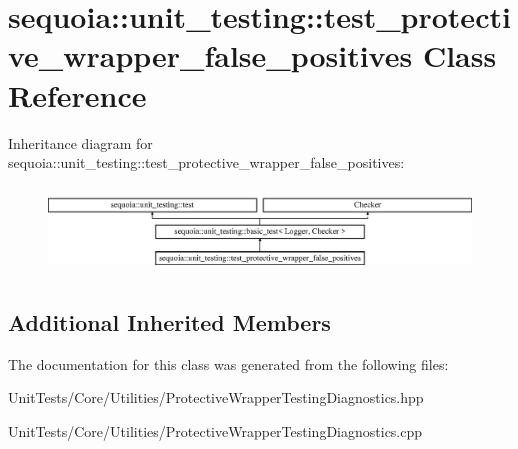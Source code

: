 \hypertarget{classsequoia_1_1unit__testing_1_1test__protective__wrapper__false__positives}{}\section{sequoia\+::unit\+\_\+testing\+::test\+\_\+protective\+\_\+wrapper\+\_\+false\+\_\+positives Class Reference}
\label{classsequoia_1_1unit__testing_1_1test__protective__wrapper__false__positives}
Inheritance diagram for sequoia\+::unit\+\_\+testing\+::test\+\_\+protective\+\_\+wrapper\+\_\+false\+\_\+positives\+:\begin{figure}[H]
\begin{center}
\leavevmode
\includegraphics[height=2.307692cm]{classsequoia_1_1unit__testing_1_1test__protective__wrapper__false__positives}
\end{center}
\end{figure}
\subsection*{Additional Inherited Members}


The documentation for this class was generated from the following files\+:\begin{DoxyCompactItemize}
\item 
Unit\+Tests/\+Core/\+Utilities/Protective\+Wrapper\+Testing\+Diagnostics.\+hpp\item 
Unit\+Tests/\+Core/\+Utilities/Protective\+Wrapper\+Testing\+Diagnostics.\+cpp\end{DoxyCompactItemize}
